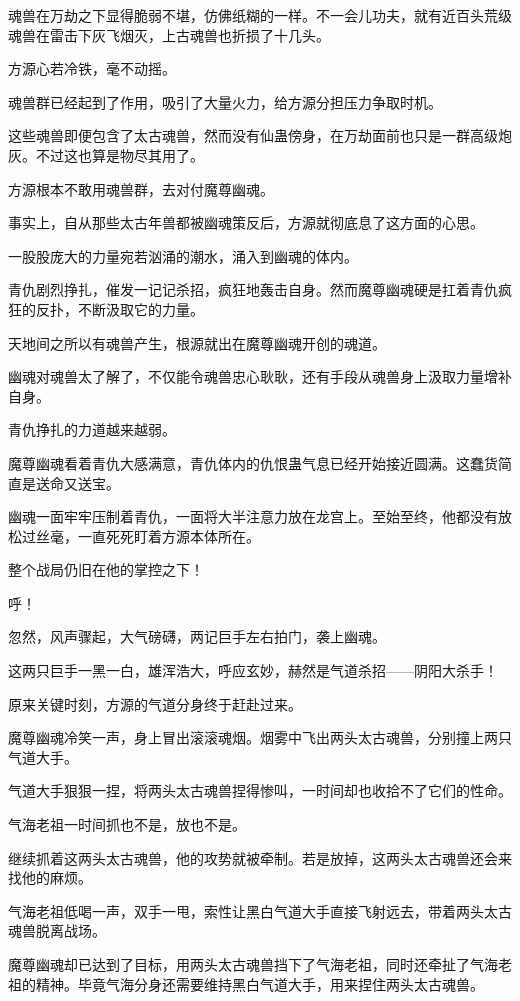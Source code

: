 \begin{this_body}
魂兽在万劫之下显得脆弱不堪，仿佛纸糊的一样。不一会儿功夫，就有近百头荒级魂兽在雷击下灰飞烟灭，上古魂兽也折损了十几头。

方源心若冷铁，毫不动摇。

魂兽群已经起到了作用，吸引了大量火力，给方源分担压力争取时机。

这些魂兽即便包含了太古魂兽，然而没有仙蛊傍身，在万劫面前也只是一群高级炮灰。不过这也算是物尽其用了。

方源根本不敢用魂兽群，去对付魔尊幽魂。

事实上，自从那些太古年兽都被幽魂策反后，方源就彻底息了这方面的心思。

一股股庞大的力量宛若汹涌的潮水，涌入到幽魂的体内。

青仇剧烈挣扎，催发一记记杀招，疯狂地轰击自身。然而魔尊幽魂硬是扛着青仇疯狂的反扑，不断汲取它的力量。

天地间之所以有魂兽产生，根源就出在魔尊幽魂开创的魂道。

幽魂对魂兽太了解了，不仅能令魂兽忠心耿耿，还有手段从魂兽身上汲取力量增补自身。

青仇挣扎的力道越来越弱。

魔尊幽魂看着青仇大感满意，青仇体内的仇恨蛊气息已经开始接近圆满。这蠢货简直是送命又送宝。

幽魂一面牢牢压制着青仇，一面将大半注意力放在龙宫上。至始至终，他都没有放松过丝毫，一直死死盯着方源本体所在。

整个战局仍旧在他的掌控之下！

呼！

忽然，风声骤起，大气磅礴，两记巨手左右拍门，袭上幽魂。

这两只巨手一黑一白，雄浑浩大，呼应玄妙，赫然是气道杀招——阴阳大杀手！

原来关键时刻，方源的气道分身终于赶赴过来。

魔尊幽魂冷笑一声，身上冒出滚滚魂烟。烟雾中飞出两头太古魂兽，分别撞上两只气道大手。

气道大手狠狠一捏，将两头太古魂兽捏得惨叫，一时间却也收拾不了它们的性命。

气海老祖一时间抓也不是，放也不是。

继续抓着这两头太古魂兽，他的攻势就被牵制。若是放掉，这两头太古魂兽还会来找他的麻烦。

气海老祖低喝一声，双手一甩，索性让黑白气道大手直接飞射远去，带着两头太古魂兽脱离战场。

魔尊幽魂却已达到了目标，用两头太古魂兽挡下了气海老祖，同时还牵扯了气海老祖的精神。毕竟气海分身还需要维持黑白气道大手，用来捏住两头太古魂兽。


\end{this_body}
